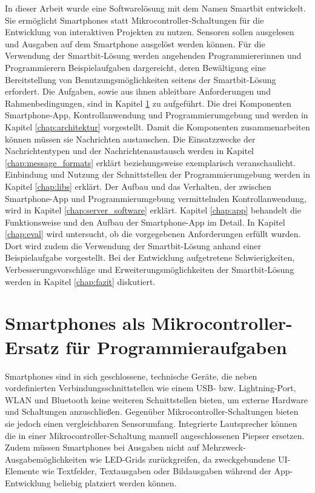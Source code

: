 \documentclass[11pt,a4paper]{report}
\begin{document}
In dieser Arbeit wurde eine Softwarelösung mit dem Namen Smartbit entwickelt.
Sie ermöglicht Smartphones statt Mikrocontroller-Schaltungen für die Entwicklung von interaktiven Projekten zu nutzen. 
Sensoren sollen ausgelesen und Ausgaben auf dem Smartphone ausgelöst werden können.
Für die Verwendung der Smartbit-Lösung werden angehenden Programmiererinnen und Programmierern Beispielaufgaben dargereicht, deren Bewältigung eine Bereitstellung von Benutzungsmöglichkeiten seitens der Smartbit-Lösung erfordert.
Die Aufgaben, sowie aus ihnen ableitbare Anforderungen und Rahmenbedingungen, sind in Kapitel \ref{chap:Experimente} zu aufgeführt.
Die drei Komponenten Smartphone-App, Kontrollanwendung und Programmierumgebung und werden in Kapitel \ref{chap:architektur} vorgestellt.
Damit die Komponenten zusammenarbeiten können müssen sie Nachrichten austauschen.
Die Einsatzzwecke der Nachrichtentypen und der Nachrichtenaustausch werden in Kapitel \ref{chap:message_formats} erklärt beziehungsweise exemplarisch veranschaulicht.
Einbindung und Nutzung der Schnittstellen der Programmierumgebung werden in Kapitel \ref{chap:libs} erklärt.
Der Aufbau und das Verhalten, der zwischen Smartphone-App und Programmierumgebung vermittelnden Kontrollanwendung, wird in Kapitel \ref{chap:server_software} erklärt.
Kapitel \ref{chap:app} behandelt die Funktionsweise und den Aufbau der Smartphone-App im Detail.
In Kapitel \ref{chap:eval} wird untersucht, ob die vorgegebenen Anforderungen erfüllt wurden.
Dort wird zudem die Verwendung der Smartbit-Lösung anhand einer Beispielaufgabe vorgestellt.
Bei der Entwicklung aufgetretene Schwierigkeiten, Verbesserungsvorschläge und Erweiterungsmöglichkeiten der Smartbit-Lösung werden in Kapitel \ref{chap:fazit} diskutiert.

\chapter{Smartphones als Mikrocontroller-Ersatz für Programmieraufgaben} \label{chap:Experimente}
Smartphones sind in sich geschlossene, technische Geräte, die neben vordefinierten Verbindungsschnittstellen wie einem USB- bzw. Lightning-Port, WLAN und Bluetooth keine weiteren Schnittstellen bieten, um externe Hardware und Schaltungen anzuschließen.
Gegenüber Mikrocontroller-Schaltungen bieten sie jedoch einen vergleichbaren Sensorumfang.
Integrierte Lautsprecher können die in einer Mikrocontroller-Schaltung  manuell angeschlossenen Piepser ersetzen.
Zudem müssen Smartphones bei Ausgaben nicht auf Mehrzweck-Ausgabemöglichkeiten wie LED-Grids zurückgreifen, da zweckgebundene UI-Elemente wie Textfelder, Textausgaben oder Bildausgaben während der App-Entwicklung beliebig platziert werden können.
\end{document}
